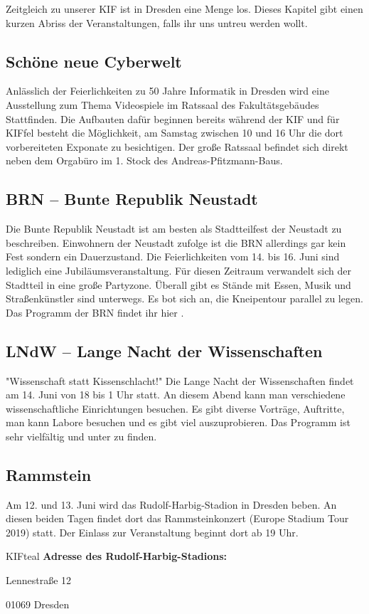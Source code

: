 Zeitgleich zu unserer KIF ist in Dresden eine Menge los. Dieses Kapitel gibt einen kurzen Abriss der Veranstaltungen, falls ihr uns untreu werden wollt.

\subsection*{Schöne neue Cyberwelt}
Anlässlich der Feierlichkeiten zu 50 Jahre Informatik in Dresden wird eine Ausstellung zum Thema Videospiele im Ratssaal des Fakultätsgebäudes Stattfinden.
Die Aufbauten dafür beginnen bereits während der KIF und für KIFfel besteht die Möglichkeit, am Samstag zwischen 10 und 16 Uhr die dort vorbereiteten Exponate zu besichtigen.
Der große Ratssaal befindet sich direkt neben dem Orgabüro im 1. Stock des Andreas-Pfitzmann-Baus.


\subsection*{BRN -- Bunte Republik Neustadt}
Die Bunte Republik Neustadt ist am besten als Stadtteilfest der Neustadt zu beschreiben.
Einwohnern der Neustadt zufolge ist die BRN allerdings gar kein Fest sondern ein Dauerzustand.
Die Feierlichkeiten vom 14. bis 16. Juni sind lediglich eine Jubiläumsveranstaltung.
Für diesen Zeitraum verwandelt sich der Stadtteil in eine große Partyzone.
Überall gibt es Stände mit Essen, Musik und Straßenkünstler sind unterwegs.
Es bot sich an, die Kneipentour parallel zu legen.
Das Programm der BRN findet ihr hier .

\subsection*{LNdW -- Lange Nacht der Wissenschaften}
"Wissenschaft statt Kissenschlacht!"
Die Lange Nacht der Wissenschaften findet am 14. Juni von 18 bis 1 Uhr statt.
An diesem Abend kann man verschiedene wissenschaftliche Einrichtungen besuchen.
Es gibt diverse Vorträge, Auftritte, man kann Labore besuchen und es gibt viel auszuprobieren.
Das Programm ist sehr vielfältig und unter  zu finden.

\subsection*{Rammstein}
Am 12. und 13. Juni wird das Rudolf-Harbig-Stadion in Dresden beben.
An diesen beiden Tagen findet dort das Rammsteinkonzert (Europe Stadium Tour 2019) statt.
Der Einlass zur Veranstaltung beginnt dort ab 19 Uhr.

\begin{awesomeblock}[KIFteal]{2pt}{\faQuestion}{KIFteal}
    \textbf{Adresse des Rudolf-Harbig-Stadions:}

    Lennestraße 12

    01069 Dresden
\end{awesomeblock}

